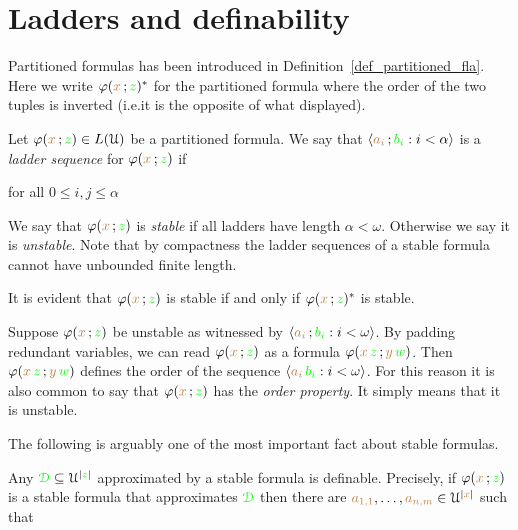 \documentclass[creche.tex]{subfiles}
\begin{document}
\section{Ladders and definability}
 
Partitioned formulas has been introduced in Definition~\ref{def_partitioned_fla}. Here we write \emph{$\varphi({\color{brown} x}\,;{\color{green} z})^*$\/} for the partitioned formula where the order of the two tuples is inverted (i.e.\@ it is the opposite of what displayed).

Let $\varphi({\color{brown} x}\,;{\color{green} z})\in L(\EuScript U)$ be a partitioned formula. We say that $\langle{\color{brown}a_i}\,;{\color{green} b_i} : i<\alpha\rangle$ is a \emph{ladder sequence\/} for $\varphi({\color{brown} x}\,;{\color{green} z})$ if 

\hfill for all $0\le i,j\le\alpha$

We say that $\varphi({\color{brown} x}\,;{\color{green} z})$ is \emph{stable\/} if all ladders have length $\alpha<\omega$. Otherwise we say it is \emph{unstable}. Note that by compactness the ladder sequences of a stable formula cannot have unbounded finite length. 

It is evident that $\varphi({\color{brown} x}\,;{\color{green} z})$ is stable if and only if $\varphi({\color{brown} x}\,;{\color{green} z})^*$ is stable.

Suppose $\varphi({\color{brown} x}\,;{\color{green} z})$ be unstable as witnessed by $\langle{\color{brown}a_i}\,;{\color{green} b_i} : i<\omega\rangle$. By padding redundant variables, we can read $\varphi({\color{brown} x}\,;{\color{green} z})$ as a formula $\varphi({\color{brown} x}\,{\color{green} z}\,;{\color{brown} y}\,{\color{green} w})$. Then $\varphi({\color{brown} x}\,{\color{green} z}\,;{\color{brown} y}\,{\color{green} w})$ defines the order of the sequence $\langle{\color{brown}a_i}\,{\color{green} b_i} : i<\omega\rangle$. For this reason it is also common to say that $\varphi({\color{brown} x}\,;{\color{green} z})$ has the \emph{order property}. It simply means that it is unstable. 

The following is arguably one of the most important fact about stable formulas.

\begin{theorem}\label{thm_def_stable_formula}
Any ${\color{green}\EuScript D}\subseteq\EuScript U^{|{\color{green} z}|}$ approximated by a stable formula is definable.
Precisely, if $\varphi({\color{brown} x}\,;{\color{green} z})$ is a stable formula that approximates ${\color{green}\EuScript D}$ then there are ${\color{brown} a_{1,1}},\dots,{\color{brown} a_{n,m}}\in\EuScript U^{|{\color{brown} x}|}$ such that 

\end{theorem}
\end{document}
